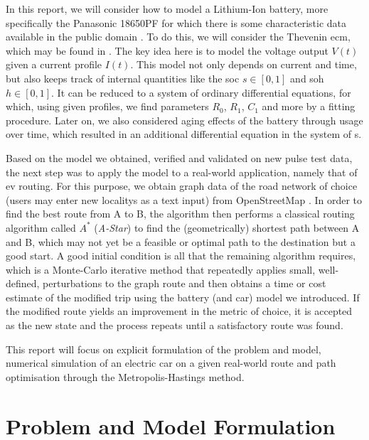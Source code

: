 \documentclass{prettytex/ox/mmsc-special-topic}
\begin{document}
  In this report, we will consider how to model a Lithium-Ion battery, more specifically the Panasonic 18650PF for which there is some characteristic data available in the public domain \parencite{panasonicnums}.
  To do this, we will consider the Thevenin \gls{ecm}, which may be found in .
  The key idea here is to model the voltage output $V(t)$ given a current profile $I(t)$.
  This model not only depends on current and time, but also keeps track of internal quantities like the \gls{soc} $s \in [0, 1]$ and \gls{soh} $h \in [0, 1]$.
  It can be reduced to a system of ordinary differential equations, for which, using given profiles, we find parameters $R_0$, $R_1$, $C_1$ and more by a fitting procedure.
  Later on, we also considered aging effects of the battery through usage over time, which resulted in an additional differential equation in the system of s.

  Based on the model we obtained, verified and validated on new pulse test data, the next step was to apply the model to a real-world application, namely that of \gls{ev} routing.
  For this purpose, we obtain graph data of the road network of choice (users may enter new localitys as a text input) from OpenStreetMap \parencite{osm}.
  In order to find the best route from A to B, the algorithm then performs a classical routing algorithm called $A^*$ (\emph{A-Star}) to find the (geometrically) shortest path between A and B, which may not yet be a feasible or optimal path to the destination but a good start.
  A good initial condition is all that the remaining algorithm requires, which is a Monte-Carlo iterative method that repeatedly applies small, well-defined, perturbations to the graph route and then obtains a time or cost estimate of the modified trip using the battery (and car) model we introduced.
  If the modified route yields an improvement in the metric of choice, it is accepted as the new state and the process repeats until a satisfactory route was found.

  This report will focus on explicit formulation of the problem and model, numerical simulation of an electric car on a given real-world route and path optimisation through the Metropolis-Hastings method.

  \section{Problem and Model Formulation}
\end{document}
